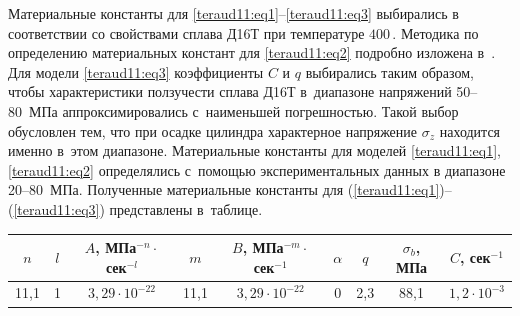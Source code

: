 \smallskip

 Материальные константы для \eqref{teraud11:eq1}--\eqref{teraud11:eq3} выбирались в
соответствии со свойствами сплава Д16Т при температуре $400$\,\textcelsius. 
Методика по определению материальных констант для \eqref{teraud11:eq2} подробно изложена в~\cite{teraud11:6}. 
Для модели \eqref{teraud11:eq3} коэффициенты $C$ и $q$ выбирались таким образом, чтобы характеристики ползучести сплава Д16Т в~диапазоне напряжений 50--80~МПа аппроксимировались с~наименьшей погрешностью. 
Такой выбор обусловлен тем, что при осадке цилиндра характерное напряжение $\sigma_{z} $ находится именно в~этом диапазоне. 
Материальные константы для моделей \eqref{teraud11:eq1}, \eqref{teraud11:eq2} определялись с~помощью экспериментальных данных в диапазоне 20--80~МПа. 
Полученные материальные константы для (\ref{teraud11:eq1})--(\ref{teraud11:eq3}) представлены в~таблице.
%
%

\begin{table}[h]
\small
\setlength{\extrarowheight}{3pt}
\setlength{\tabcolsep}{4.3pt}
\begin{tabular}{c|c|c||c|c||c|c|c|c}
\hline $n$ & $l$ & $A$, МПа$^{-n}{}\cdot{}$сек$^{-l}$ & $m$ & $B$, МПа$^{-m}{}\cdot{}$сек$^{-1}$ & $\alpha$ & $q$ & $\sigma_b$, МПа & $C$, сек$^{-1}$ \\
\hline
11{,}1 & 1 & $3{,}29\cdot 10^{-22}$ & 11{,}1 & $3{,}29\cdot 10^{-22}$ & 0 & 2{,}3 & 88{,}1 &  $1{,}2\cdot 10^{-3}$ \\
\hline
\end{tabular} 
\end{table}

